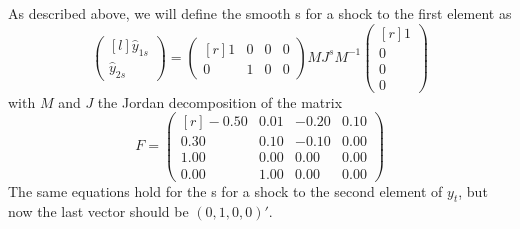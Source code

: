 \documentclass[12pt,fleqn]{article}
\begin{document}
As described above, we will define the smooth \IRF s for a shock to
the first element as
\begin{equation*}
  \begin{pmatrix*}[l]
    \hat y_{1s} \\ \hat y_{2s}
  \end{pmatrix*}
  =
  \begin{pmatrix*}[r]
    1 & 0 & 0 & 0 \\ 0 & 1 & 0 & 0
  \end{pmatrix*}
  M J^s M^{-1}
  \begin{pmatrix*}[r]
    1 \\ 0 \\ 0 \\ 0
  \end{pmatrix*}
\end{equation*}
with $M$ and $J$ the Jordan decomposition of the matrix
\begin{equation}
F = \begin{pmatrix*}[r]
    - 0.50 & 0.01 & -0.20 & 0.10 \\
      0.30 & 0.10 & -0.10 & 0.00 \\
      1.00 & 0.00 & 0.00 & 0.00 \\
      0.00 & 1.00 & 0.00 & 0.00
  \end{pmatrix*}
\end{equation}
The same equations hold for the \IRF s for a shock to the second
element of $y_t$, but now the last vector should be $(0, 1, 0, 0)'$.
\end{document}

